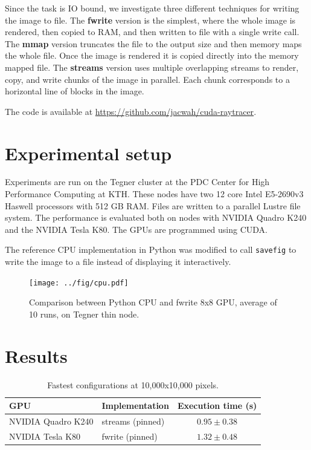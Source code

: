 \documentclass{article}
\begin{document}
Since the task is IO bound, we investigate three different techniques for
writing the image to file. The \textbf{fwrite} version is the simplest, where
the whole image is rendered, then copied to RAM, and then written to file with a
single write call. The \textbf{mmap} version truncates the file to the output
size and then memory maps the whole file. Once the image is rendered it is
copied directly into the memory mapped file. The \textbf{streams} version uses
multiple overlapping streams to render, copy, and write chunks of the image in
parallel. Each chunk corresponds to a horizontal line of blocks in the image.

The code is available at \url{https://github.com/jacwah/cuda-raytracer}.

\section{Experimental setup}

Experiments are run on the Tegner cluster at the PDC Center for High Performance
Computing at KTH. These nodes have two 12 core Intel E5-2690v3 Haswell
processors with 512 GB RAM. Files are written to a parallel Lustre file system.
The performance is evaluated both on nodes with NVIDIA Quadro K240 and the
NVIDIA Tesla K80. The GPUs are programmed using CUDA.

The reference CPU implementation in Python was modified to call \verb|savefig|
to write the image to a file instead of displaying it interactively.

\begin{figure}
    \texttt{[image: ../fig/cpu.pdf]}
    \caption{Comparison between Python CPU and fwrite 8x8
    GPU, average of 10 runs, on Tegner thin node.}
    \label{fig:cpu}
\end{figure}

\section{Results}

\begin{table}
    \centering
    \begin{tabular}{@{}llc@{}}
        \toprule
        GPU & Implementation & Execution time (s) \\
        \midrule
        NVIDIA Quadro K240 & streams (pinned) & $0.95 \pm 0.38$ \\
        NVIDIA Tesla K80 & fwrite (pinned) & $1.32 \pm 0.48$ \\
        \bottomrule
    \end{tabular}
    \caption{Fastest configurations at 10,000x10,000 pixels.}
    \label{tab:fast}
\end{table}
\end{document}
